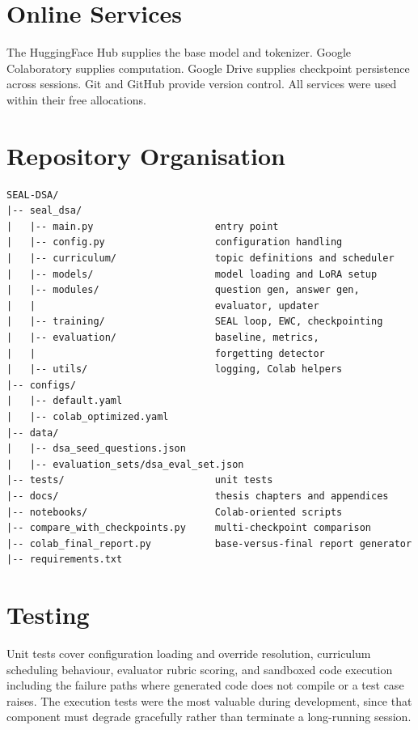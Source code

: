 \documentclass[12pt,a4paper]{report}
\begin{document}
\section{Online Services}

The HuggingFace Hub supplies the base model and tokenizer. Google Colaboratory supplies computation. Google Drive supplies checkpoint persistence across sessions. Git and GitHub provide version control. All services were used within their free allocations.

\section{Repository Organisation}

\FloatBarrier
\begin{lstlisting}
SEAL-DSA/
|-- seal_dsa/
|   |-- main.py                     entry point
|   |-- config.py                   configuration handling
|   |-- curriculum/                 topic definitions and scheduler
|   |-- models/                     model loading and LoRA setup
|   |-- modules/                    question gen, answer gen, 
|   |                               evaluator, updater
|   |-- training/                   SEAL loop, EWC, checkpointing
|   |-- evaluation/                 baseline, metrics, 
|   |                               forgetting detector
|   |-- utils/                      logging, Colab helpers
|-- configs/
|   |-- default.yaml
|   |-- colab_optimized.yaml
|-- data/
|   |-- dsa_seed_questions.json
|   |-- evaluation_sets/dsa_eval_set.json
|-- tests/                          unit tests
|-- docs/                           thesis chapters and appendices
|-- notebooks/                      Colab-oriented scripts
|-- compare_with_checkpoints.py     multi-checkpoint comparison
|-- colab_final_report.py           base-versus-final report generator
|-- requirements.txt
\end{lstlisting}

\section{Testing}

Unit tests cover configuration loading and override resolution, curriculum scheduling behaviour, evaluator rubric scoring, and sandboxed code execution including the failure paths where generated code does not compile or a test case raises. The execution tests were the most valuable during development, since that component must degrade gracefully rather than terminate a long-running session.
\end{document}
